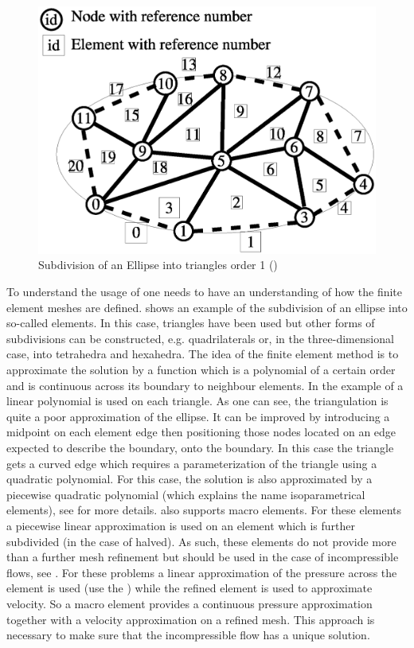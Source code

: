 \begin{figure}
\centerline{\includegraphics{FinleyMesh}}
\caption{Subdivision of an Ellipse into triangles order 1 ()}
\label{FINLEY FIG 0}
\end{figure}

To understand the usage of \finley one needs to have an understanding of how
the finite element meshes are defined.
 shows an example of the subdivision of an ellipse into
so-called elements.
In this case, triangles have been used but other forms of subdivisions can be
constructed, e.g. quadrilaterals or, in the three-dimensional case, into
tetrahedra and hexahedra. The idea of the finite element method is to
approximate the solution by a function which is a polynomial of a certain order
and is continuous across its boundary to neighbour elements.
In the example of  a linear polynomial is used on each
triangle. As one can see, the triangulation is quite a poor approximation of
the ellipse. It can be improved by introducing a midpoint on each element edge
then positioning those nodes located on an edge expected to describe the
boundary, onto the boundary.
In this case the triangle gets a curved edge which requires a parameterization
of the triangle using a quadratic polynomial.
For this case, the solution is also approximated by a piecewise quadratic
polynomial (which explains the name isoparametrical elements),
see  for more details.
\finley also supports macro elements.
For these elements a piecewise linear approximation is used on an element which
is further subdivided (in the case of \finley halved).
As such, these elements do not provide more than a further mesh refinement but
should be used in the case of incompressible flows, see .
For these problems a linear approximation of the pressure across the element is
used (use the \ReducedSolutionFS) while the refined element is used to
approximate velocity. So a macro element provides a continuous pressure
approximation together with a velocity approximation on a refined mesh.
This approach is necessary to make sure that the incompressible flow has a
unique solution.

